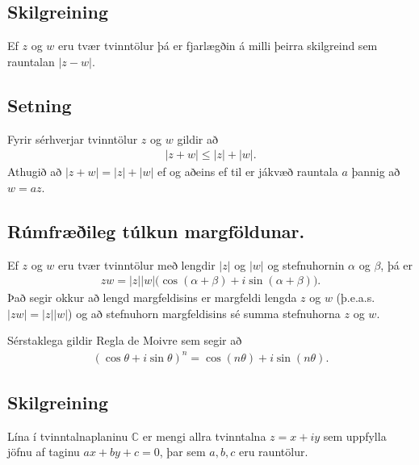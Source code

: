 \documentclass[a4paper,10pt,icelandic]{sphinxmanual}
\begin{document}
\subsection{Skilgreining}
\label{\detokenize{Kafli01:id5}}
Ef \(z\) og \(w\) eru tvær tvinntölur þá er
fjarlægðin á milli þeirra skilgreind sem rauntalan \(|z-w|\).


\subsection{Setning}
\label{\detokenize{Kafli01:id6}}
Fyrir sérhverjar tvinntölur \(z\) og \(w\) gildir
að
\begin{equation*}
\begin{split}|z+w|\leq |z|+|w|.\end{split}
\end{equation*}
Athugið að \(|z+w|=|z|+|w|\) ef og aðeins ef til er jákvæð rauntala
\(a\) þannig að \(w=az\).


\subsection{Rúmfræðileg túlkun margföldunar.}
\label{\detokenize{Kafli01:rumfraeileg-tulkun-margfoldunar}}
Ef \(z\) og \(w\) eru tvær
tvinntölur með lengdir \(|z|\) og \(|w|\) og stefnuhornin
\(\alpha\) og \(\beta\), þá er
\begin{equation*}
\begin{split}zw=|z||w|\big(\cos(\alpha+\beta)+i\sin(\alpha+\beta)\big).\end{split}
\end{equation*}
Það segir okkur að lengd margfeldisins er margfeldi lengda \(z\) og
\(w\) (þ.e.a.s. \(|zw|=|z||w|\)) og að stefnuhorn margfeldisins
sé summa stefnuhorna \(z\) og \(w\).

Sérstaklega gildir Regla de Moivre sem segir að
\begin{equation*}
\begin{split}(\cos \theta+i\sin\theta)^n=\cos(n\theta)+i\sin(n\theta).\end{split}
\end{equation*}

\subsection{Skilgreining}
\label{\detokenize{Kafli01:id7}}
Lína í tvinntalnaplaninu \({\mathbb{C}}\) er mengi allra
tvinntalna \(z=x+iy\) sem uppfylla jöfnu af taginu
\(ax+by+c=0\), þar sem \(a,b,c\) eru rauntölur.
\end{document}

